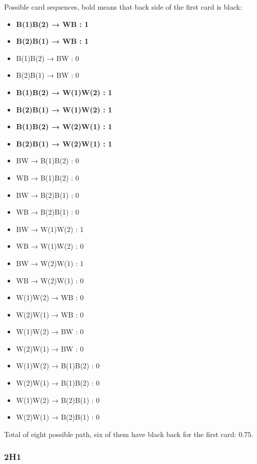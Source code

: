 \documentclass[
]{book}
\begin{document}
Possible card sequences, bold means that back side of the first card is black:

\begin{itemize}
\item
  \textbf{B(1)\textbar B(2) → W\textbar B : 1}
\item
  \textbf{B(2)\textbar B(1) → W\textbar B : 1}
\item
  B(1)\textbar B(2) → B\textbar W : 0
\item
  B(2)\textbar B(1) → B\textbar W : 0
\item
  \textbf{B(1)\textbar B(2) → W(1)\textbar W(2) : 1}
\item
  \textbf{B(2)\textbar B(1) → W(1)\textbar W(2) : 1}
\item
  \textbf{B(1)\textbar B(2) → W(2)\textbar W(1) : 1}
\item
  \textbf{B(2)\textbar B(1) → W(2)\textbar W(1) : 1}
\item
  B\textbar W → B(1)\textbar B(2) : 0
\item
  W\textbar B → B(1)\textbar B(2) : 0
\item
  B\textbar W → B(2)\textbar B(1) : 0
\item
  W\textbar B → B(2)\textbar B(1) : 0
\item
  B\textbar W → W(1)\textbar W(2) : 1
\item
  W\textbar B → W(1)\textbar W(2) : 0
\item
  B\textbar W → W(2)\textbar W(1) : 1
\item
  W\textbar B → W(2)\textbar W(1) : 0
\item
  W(1)\textbar W(2) → W\textbar B : 0
\item
  W(2)\textbar W(1) → W\textbar B : 0
\item
  W(1)\textbar W(2) → B\textbar W : 0
\item
  W(2)\textbar W(1) → B\textbar W : 0
\item
  W(1)\textbar W(2) → B(1)\textbar B(2) : 0
\item
  W(2)\textbar W(1) → B(1)\textbar B(2) : 0
\item
  W(1)\textbar W(2) → B(2)\textbar B(1) : 0
\item
  W(2)\textbar W(1) → B(2)\textbar B(1) : 0
\end{itemize}

Total of eight possible path, six of them have black back for the first card: \(0.75\).

\hypertarget{h1}{%
\subsubsection*{2H1}\label{h1}}
\end{document}
